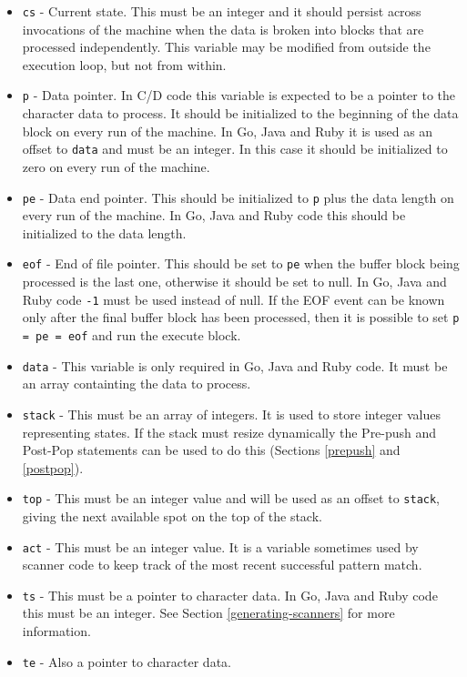 \documentclass[letterpaper,11pt,oneside]{book}
\begin{document}
\begin{itemize}

\item \verb|cs| - Current state. This must be an integer and it should persist
across invocations of the machine when the data is broken into blocks that are
processed independently. This variable may be modified from outside the
execution loop, but not from within.

\item \verb|p| - Data pointer. In C/D code this variable is expected to be a
pointer to the character data to process. It should be initialized to the
beginning of the data block on every run of the machine. In Go, Java and Ruby it is
used as an offset to \verb|data| and must be an integer. In this case it should
be initialized to zero on every run of the machine.

\item \verb|pe| - Data end pointer. This should be initialized to \verb|p| plus
the data length on every run of the machine. In Go, Java and Ruby code this should
be initialized to the data length.

\item \verb|eof| - End of file pointer. This should be set to \verb|pe| when
the buffer block being processed is the last one, otherwise it should be set to
null. In Go, Java and Ruby code \verb|-1| must be used instead of null. If the EOF
event can be known only after the final buffer block has been processed, then
it is possible to set \verb|p = pe = eof| and run the execute block.

\item \verb|data| - This variable is only required in Go, Java and Ruby code. It
must be an array containting the data to process.

\item \verb|stack| - This must be an array of integers. It is used to store
integer values representing states. If the stack must resize dynamically the
Pre-push and Post-Pop statements can be used to do this (Sections
\ref{prepush} and \ref{postpop}).

\item \verb|top| - This must be an integer value and will be used as an offset
to \verb|stack|, giving the next available spot on the top of the stack.

\item \verb|act| - This must be an integer value. It is a variable sometimes
used by scanner code to keep track of the most recent successful pattern match.

\item \verb|ts| - This must be a pointer to character data. In Go, Java and
Ruby code this must be an integer. See Section \ref{generating-scanners} for
more information.

\item \verb|te| - Also a pointer to character data.

\end{itemize}
\end{document}
